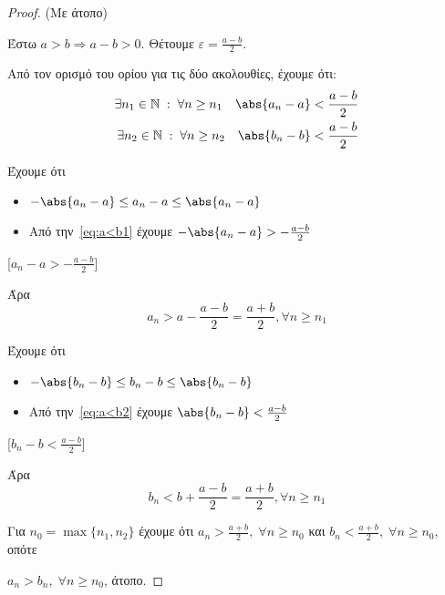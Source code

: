 \documentclass[main.tex]{subfiles}
\begin{document}
\begin{proof}(Με άτοπο)
\item {}
    Έστω $ a>b \Rightarrow a-b>0 $. Θέτουμε $ \varepsilon = 
    \frac{a-b}{2} $.

    Από τον ορισμό του ορίου για τις δύο ακολουθίες, έχουμε ότι:
    \begin{align}
        \exists n_{1} \in \mathbb{N} \; : \; \forall n \geq n_{1} 
        \quad \abs{a_{n}-a} < \frac{a-b}{2} \label{eq:a<b1} \\
        \exists n_{2} \in \mathbb{N} \; : \; \forall n \geq n_{2} 
        \quad \abs{b_{n}-b} < \frac{a-b}{2} \label{eq:a<b2} 
    \end{align}

    Έχουμε ότι

    \begin{minipage}{0.5\textwidth}
    \begin{itemize}
        \item $ -\abs{a_{n}-a} \leq a_{n}-a \leq \abs{a_{n}-a} $ \hfill 
        \item Από την~\eqref{eq:a<b1} έχουμε $ - \abs{a_{n}-a} > - 
            \frac{a-b}{2} $ \hfill {}
    \end{itemize}    
    \end{minipage}

    [$ a_{n}- a > - \frac{a-b}{2}$]

    Άρα \[ a_{n} > a - \frac{a-b}{2} 
    = \frac{a+b}{2}, \forall n \geq n_{1} \]

    Έχουμε ότι

    \begin{minipage}{0.5\textwidth}
    \begin{itemize}
        \item $ -\abs{b_{n}-b} \leq b_{n}-b \leq \abs{b_{n}-b} $ \hfill 
        \item Από την~\eqref{eq:a<b2} έχουμε $ \abs{b_{n}-b} < 
            \frac{a-b}{2} $ \hfill {}
    \end{itemize}    
    \end{minipage}

    [$ b_{n}- b < \frac{a-b}{2}$]

    Άρα \[ b_{n} < b + \frac{a-b}{2} 
    = \frac{a+b}{2}, \forall n \geq n_{1} \]


    Για $ n_{0} = \max \{ n_{1}, n_{2} \} $ έχουμε ότι $ a_{n} > 
    \frac{a+b}{2}, \; \forall n \geq n_{0}$
    και $ b_{n} < \frac{a+b}{2}, \; \forall n \geq n_{0}$, οπότε

    $a_{n} > b_{n}, \; \forall n \geq n_{0} $, άτοπο.
\end{proof}
\end{document}

